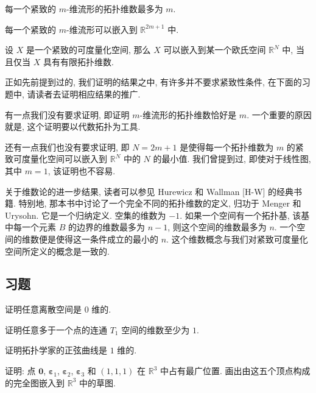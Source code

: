 \begin{corollary}
\label{corollary:ch08-sec50-50-7}
每一个紧致的 $m$-维流形的拓扑维数最多为 $m$.
\end{corollary}

\begin{corollary}
\label{corollary:ch08-sec50-50-8}
每一个紧致的 $m$-维流形可以嵌入到 $\mathbb{R}^{2m+1}$ 中.
\end{corollary}

\begin{corollary}
\label{corollary:ch08-sec50-50-9}
设 $X$ 是一个紧致的可度量化空间, 那么 $X$ 可以嵌入到某一个欧氏空间 $\mathbb{R}^{N}$ 中, 当且仅当 $X$ 具有有限拓扑维数.
\end{corollary}

正如先前提到过的, 我们证明的结果之中, 有许多并不要求紧致性条件, 在下面的习题中, 请读者去证明相应结果的推广.

有一点我们没有要求证明, 即证明 $m$-维流形的拓扑维数恰好是 $m$. 一个重要的原因就是, 这个证明要以代数拓扑为工具.

还有一点我们也没有要求证明, 即 $N=2m+1$ 是使得每一个拓扑维数为 $m$ 的紧致可度量化空间可以嵌入到 $\mathbb{R}^{N}$ 中的 $N$ 的最小值. 我们曾提到过, 即使对于线性图, 其中 $m=1$, 该证明也不容易.

关于维数论的进一步结果, 读者可以参见 Hurewicz 和 Wallman [H-W] 的经典书籍. 特别地, 那本书中讨论了一个完全不同的拓扑维数的定义, 归功于 Menger 和 Urysohn. 它是一个归纳定义. 空集的维数为 $-1$. 如果一个空间有一个拓扑基, 该基中每一个元素 $B$ 的边界的维数最多为 $n-1$, 则这个空间的维数最多为 $n$. 一个空间的维数便是使得这一条件成立的最小的 $n$. 这个维数概念与我们对紧致可度量化空间所定义的概念是一致的.

\subsection*{习题}

\begin{exercise}
证明任意离散空间是 $0$ 维的.
\end{exercise}

\begin{exercise}
证明任意多于一个点的连通 $T_1$ 空间的维数至少为 $1$.
\end{exercise}

\begin{exercise}
证明拓扑学家的正弦曲线是 $1$ 维的.
\end{exercise}

\begin{exercise}
证明: 点 $\boldsymbol{0}$, $\boldsymbol{\varepsilon}_1$, $\boldsymbol{\varepsilon}_2$, $\boldsymbol{\varepsilon}_3$ 和 $(1,1,1)$ 在 $\mathbb{R}^{3}$ 中占有最广位置. 画出由这五个顶点构成的完全图嵌入到 $\mathbb{R}^{3}$ 中的草图.
\end{exercise}

